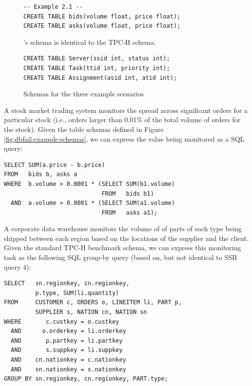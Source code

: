 \begin{figure}
\begin{verbatim}
-- Example 2.1 --
CREATE TABLE bids(volume float, price float);
CREATE TABLE asks(volume float, price float);
\end{verbatim}

's schema is identical to the TPC-H schema\cite{tpch}.

\begin{verbatim}
CREATE TABLE Server(ssid int, status int);
CREATE TABLE Task(ttid int, priority int);
CREATE TABLE Assignment(asid int, atid int);
\end{verbatim}

\label{fig:dbfail:schemas}
\caption{Schemas for the three example scenarios}
\end{figure}

\begin{example}
\label{ex:dbfail:stock}
A stock market trading system monitors the spread across significant orders for a particular stock (i.e., orders larger than 0.01\% of the total volume of orders for the stock).  Given the table schemas defined in Figure \ref{fig:dbfail:example:schemas}, we can express the value being monitored as a SQL query:
\begin{verbatim}
SELECT SUM(a.price - b.price)
FROM   bids b, asks a
WHERE  b.volume > 0.0001 * (SELECT SUM(b1.volume) 
                            FROM   bids b1)
  AND  a.volume > 0.0001 * (SELECT SUM(a1.volume) 
                            FROM   asks a1);
\end{verbatim}

\end{example}

\begin{example}
\label{ex:dbfail:tpch}
A corporate data warehouse monitors the volume of of parts of each type being shipped between each region based on the locations of the supplier and the client.  Given the standard TPC-H benchmark schema\cite{tpch}, we can express this monitoring task as the following SQL group-by query (based on, but not identical to SSB query 4\cite{ssb}): 
\begin{verbatim}
SELECT   sn.regionkey, cn.regionkey,
         p.type, SUM(li.quantity)
FROM     CUSTOMER c, ORDERS o, LINEITEM li, PART p, 
         SUPPLIER s, NATION cn, NATION sn
WHERE       c.custkey = o.custkey
  AND      o.orderkey = li.orderkey
  AND       p.partkey = li.partkey
  AND       s.suppkey = li.suppkey
  AND    cn.nationkey = c.nationkey
  AND    sn.nationkey = s.nationkey
GROUP BY sn.regionkey, cn.regionkey, PART.type;
\end{verbatim}

\end{example}

